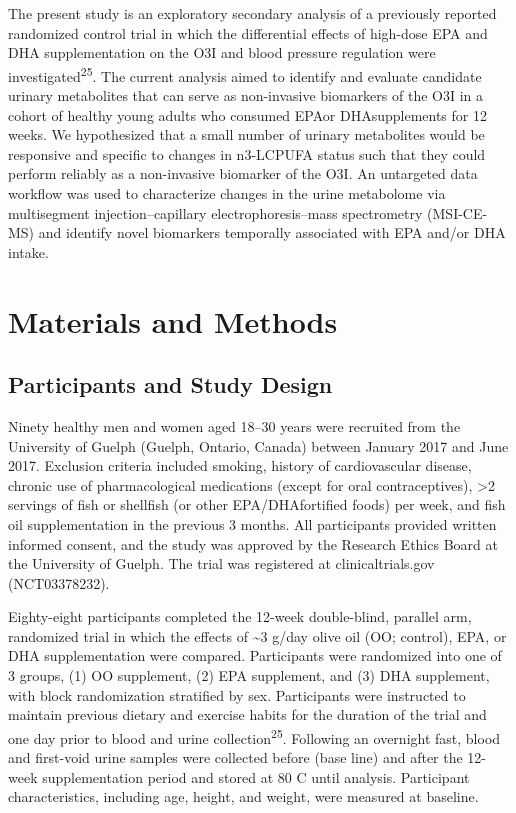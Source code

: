 \documentclass[journal=jacsat,manuscript=article]{achemso}
\begin{document}
The present study is an exploratory secondary analysis of a previously
reported randomized control trial in which the differential effects of
high-dose EPA and DHA supplementation on the O3I and blood pressure
regulation were investigated\textsuperscript{25}. The current analysis
aimed to identify and evaluate candidate urinary metabolites that can
serve as non-invasive biomarkers of the O3I in a cohort of healthy young
adults who consumed EPAor DHAsupplements for 12 weeks. We hypothesized
that a small number of urinary metabolites would be responsive and
specific to changes in n3-LCPUFA status such that they could perform
reliably as a non-invasive biomarker of the O3I. An untargeted data
workflow was used to characterize changes in the urine metabolome via
multisegment injection--capillary electrophoresis--mass spectrometry
(MSI-CE-MS) and identify novel biomarkers temporally associated with EPA
and/or DHA intake.

\section{Materials and Methods}\label{materials-and-methods}

\subsection{Participants and Study
Design}\label{participants-and-study-design}

Ninety healthy men and women aged 18--30 years were recruited from the
University of Guelph (Guelph, Ontario, Canada) between January 2017 and
June 2017. Exclusion criteria included smoking, history of
cardiovascular disease, chronic use of pharmacological medications
(except for oral contraceptives), \textgreater2 servings of fish or
shellfish (or other EPA/DHAfortified foods) per week, and fish oil
supplementation in the previous 3 months. All participants provided
written informed consent, and the study was approved by the Research
Ethics Board at the University of Guelph. The trial was registered at
clinicaltrials.gov (NCT03378232).

Eighty-eight participants completed the 12-week double-blind, parallel
arm, randomized trial in which the effects of \textasciitilde3 g/day
olive oil (OO; control), EPA, or DHA supplementation were compared.
Participants were randomized into one of 3 groups, (1) OO supplement,
(2) EPA supplement, and (3) DHA supplement, with block randomization
stratified by sex. Participants were instructed to maintain previous
dietary and exercise habits for the duration of the trial and one day
prior to blood and urine collection\textsuperscript{25}. Following an
overnight fast, blood and first-void urine samples were collected before
(base line) and after the 12-week supplementation period and stored at
80 C until analysis. Participant characteristics, including age, height,
and weight, were measured at baseline.
\end{document}
